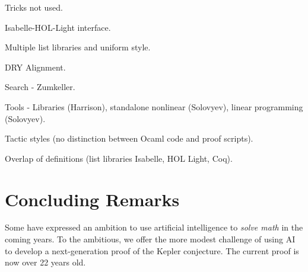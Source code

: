 \documentclass{amsart}
\begin{document}
Tricks not used.



Isabelle-HOL-Light interface.

Multiple list libraries and uniform style.

DRY Alignment.

Search - Zumkeller.

Tools - Libraries (Harrison), standalone nonlinear (Solovyev), linear programming (Solovyev).

Tactic styles (no distinction between Ocaml code and proof scripts).

Overlap of definitions (list libraries Isabelle, HOL Light, Coq).



\section{Concluding Remarks}

Some have expressed an ambition to use artificial intelligence to
\emph{solve math} in 
the coming years.  To the ambitious, we offer the more modest
challenge of using AI to develop a next-generation proof of the Kepler
conjecture.  The current proof is now over 22 years old.


\newpage


 

\end{document}
